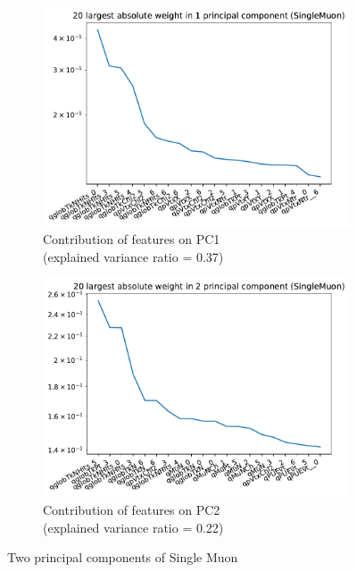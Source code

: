 \begin{figure}[h!]
\begin{subfigure}[b]{0.49\linewidth}
        \includegraphics[width=\linewidth]{images/reco/2018/feature_2/SingleMuon_pc1.pdf}
        \caption{Contribution of features on PC1 \\ (explained variance ratio = 0.37)}
    \end{subfigure}
    \begin{subfigure}[b]{0.49\linewidth}
        \includegraphics[width=\linewidth]{images/reco/2018/feature_2/SingleMuon_pc2.pdf}
        \caption{Contribution of features on PC2 \\ (explained variance ratio = 0.22)}
    \end{subfigure}
    \caption{Two principal components of Single Muon}
\label{fig:2018_SingleMuon_subsystem_label}
\end{figure}


